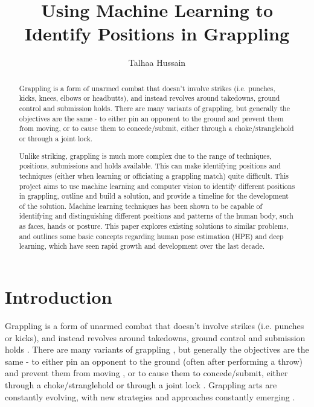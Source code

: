 \documentclass[a4paper, oneside, 11pt]{article}
\title{Using Machine Learning to Identify Positions in Grappling}
\author{Talhaa Hussain}
\date{}
\begin{document}
\maketitle


\begin{abstract}
    Grappling is a form of unarmed combat that doesn't involve strikes (i.e. punches, kicks, knees, elbows or headbutts), and instead revolves around takedowns, ground control and submission holds. There are many variants of grappling, but generally the objectives are the same - to either pin an opponent to the ground and prevent them from moving, or to cause them to concede/submit, either through a choke/stranglehold or through a joint lock.

    Unlike striking, grappling is much more complex due to the range of techniques, positions, submissions and holds available. This can make identifying positions and techniques (either when learning or officiating a grappling match) quite difficult. This project aims to use machine learning and computer vision to identify different positions in grappling, outline and build a solution, and provide a timeline for the development of the solution. Machine learning techniques has been shown to be capable of identifying and distinguishing different positions and patterns of the human body, such as faces, hands or posture. This paper explores existing solutions to similar problems, and outlines some basic concepts regarding human pose estimation (HPE) and deep learning, which have seen rapid growth and development over the last decade. 
\end{abstract}


\newpage
\section{Introduction}

Grappling is a form of unarmed combat that doesn't involve strikes (i.e. punches or kicks), and instead revolves around takedowns, ground control and submission holds \cite{ribeiro2008jiu}. There are many variants of grappling \cite{cejudo2012wrestling}\cite{DifferentTypesOfWrestling}, but generally the objectives are the same - to either pin an opponent to the ground (often after performing a throw) and prevent them from moving \cite{cejudo2012wrestling}, or to cause them to concede/submit, either through a choke/stranglehold or through a joint lock \cite{takagaki2012techniques}. Grappling arts are constantly evolving, with new strategies and approaches constantly emerging \cite{JohnDanaherJiuJitsuEvolution}.
\end{document}
